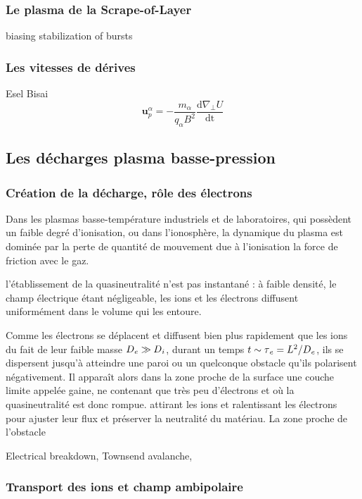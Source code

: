 \begin{refsection}
\subsubsection{Le plasma de la Scrape-of-Layer}
\parencite{Ghendrih}biasing stabilization of bursts
\subsubsection{Les vitesses de dérives}
\parencite{Garcia}Esel
\parencite{Bisai}Bisai
\label{vitessesDerive}
\begin{equation}
\label{1-vitessePol}
\mathbf{u}_p^\alpha=-\frac{m_\alpha}{q_\alpha B^2}\frac{\text{d}\nabla_\perp
U}{\text{dt}}
\end{equation}
\subsection{Les décharges plasma basse-pression}
\label{1-transportAmbipolaire}

\subsubsection{Création de la décharge, rôle des électrons}

Dans les plasmas basse-température industriels et de laboratoires, qui
possèdent un faible degré d'ionisation, ou dans l'ionosphère, la dynamique du
plasma est dominée par la perte de quantité de mouvement due à l'ionisation la force de friction avec
le gaz.

l'établissement de la quasineutralité n'est pas instantané : à faible densité,
le champ électrique étant négligeable, les ions et les électrons diffusent
uniformément dans le volume qui les entoure.

Comme les électrons se déplacent et diffusent bien plus rapidement que les ions
du fait de leur faible masse $D{_{e}}\gg D{_{i}}$, durant un temps
$t\sim \tau{_{e}}=L^{{2}}/D{_{e}}$, ils se dispersent jusqu'à atteindre
une paroi ou un quelconque obstacle qu'ils polarisent négativement. Il apparaît
alors dans la zone proche de la surface une couche limite appelée gaine, ne
contenant que très peu d'électrons et où la quasineutralité est donc rompue. 
attirant les ions et ralentissant les électrons pour ajuster leur flux et
préserver la neutralité du matériau. La zone proche de l'obstacle



Electrical breakdown, Townsend avalanche,
\subsubsection{Transport des ions et champ ambipolaire}
\begin{equation}
\label{derivediffusion}
\end{equation}

\end{refsection}
